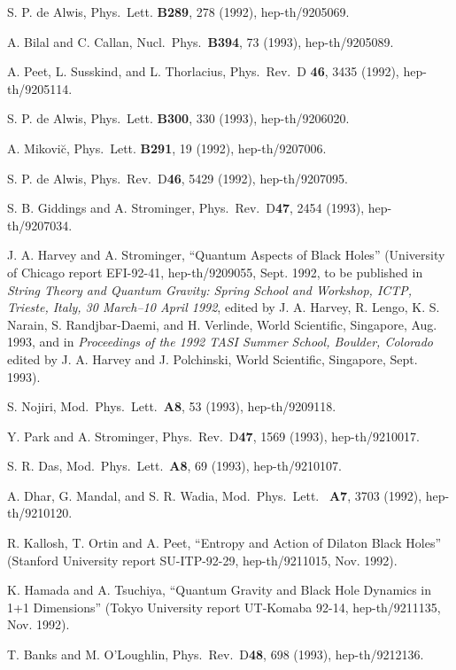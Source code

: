 \begin{thebibliography}{999}
 S. P. de Alwis, Phys.\ Lett. {\bf B289}, 278 (1992),
hep-th/9205069.

 A. Bilal and C. Callan, Nucl.\ Phys.\ {\bf B394}, 73
(1993),
hep-th/9205089.

 A. Peet, L. Susskind, and L. Thorlacius, Phys.\ Rev.\
D{\bf
46},
3435 (1992), hep-th/9205114.

 S. P. de Alwis, Phys.\ Lett. {\bf B300}, 330 (1993),
hep-th/9206020.

 A. Mikovi\u{c}, Phys.\ Lett. {\bf B291}, 19 (1992),
hep-th/9207006.

 S. P. de Alwis, Phys.\ Rev.\ D{\bf 46}, 5429 (1992),
hep-th/9207095.

 S. B. Giddings and A. Strominger, Phys.\ Rev.\
D{\bf 47},
2454 (1993), hep-th/9207034.

 J. A. Harvey and A. Strominger, ``Quantum Aspects of
Black
Holes''
(University of Chicago report EFI-92-41, hep-th/9209055, Sept. 1992,
to be
published in {\em String Theory and Quantum Gravity:  Spring School
and
Workshop, ICTP, Trieste, Italy, 30 March--10 April 1992}, edited by
J. A.
Harvey, R. Lengo, K. S. Narain, S. Randjbar-Daemi, and H. Verlinde,
World Scientific, Singapore, Aug. 1993,
and in {\em Proceedings of the 1992 TASI Summer
School, Boulder, Colorado} edited by J. A. Harvey and J. Polchinski,
World Scientific, Singapore, Sept. 1993).

 S. Nojiri, Mod.\ Phys.\ Lett.\ {\bf A8}, 53 (1993),
hep-th/9209118.

 Y. Park and A. Strominger, Phys.\ Rev.\ D{\bf 47},
1569
(1993),
hep-th/9210017.

 S. R. Das, Mod.\ Phys.\ Lett.\ {\bf A8}, 69 (1993),
hep-th/9210107.

 A. Dhar, G. Mandal, and S. R. Wadia, Mod.\ Phys.\
Lett.\ {\bf
A7},
3703 (1992), hep-th/9210120.

 R. Kallosh, T. Ortin and A. Peet, ``Entropy and Action
of Dilaton Black Holes'' (Stanford University report SU-ITP-92-29,
hep-th/9211015,
Nov. 1992).

 K. Hamada and A. Tsuchiya, ``Quantum Gravity and Black
Hole
Dynamics in 1+1 Dimensions'' (Tokyo University report UT-Komaba
92-14,
hep-th/9211135, Nov. 1992).

 T. Banks and M. O'Loughlin,  Phys.\ Rev.\ D{\bf 48},
698
(1993),
hep-th/9212136.


\end{thebibliography}
